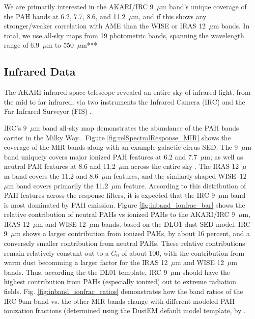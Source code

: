 \documentclass[preprint2,longabstract]{aastex}
\begin{document}
We are primarily interested in the AKARI/IRC 9~$\mu$m band's unique coverage of the PAH bands at 6.2, 7.7, 8.6, and 11.2~$\mu$m, and if this shows any stronger/weaker correlation with AME than the WISE or IRAS 12~$\mu$m bands. In total, we use all-sky maps from 19 photometric bands, spanning the wavelength range of 6.9~$\mu$m to 550~$\mu$m***

\subsection{Infrared Data}

     The AKARI infrared space telescope revealed an entire sky of infrared light, from the mid to far infrared, via two instruments \citep{akari07} the Infrared Camera (IRC)\citep{irc07} and the Far Infrared Surveyor (FIS) \citep{fis07}.

     IRC's 9~$\mu$m band all-sky map demonstrates the abundance of the PAH bands carrier in the Milky Way \citep{ishihara10}. Figure \ref{fig:relSpectralResponse_MIR} shows the coverage of the MIR bands along with an example galactic cirrus SED. The 9~$\mu$m band uniquely covers major ionized PAH features at 6.2 and 7.7~$\mu$m; as well as neutral PAH features at 8.6 and 11.2~$\mu$m across the entire sky \citep{irc07}. The IRAS 12~$\mu$m band covers the 11.2 and 8.6~$\mu$m features, and the similarly-shaped WISE~12~$\mu$m band covers primarily the 11.2~$\mu$m feature. According to this distribution of PAH features across the response filters, it is expected that the IRC 9~$\mu$m band is most dominated by PAH emission. Figure \ref{fig:inband_ionfrac_bar} shows the relative contribution of neutral PAHs vs ionized PAHs to the AKARI/IRC 9~$\mu$m, IRAS 12~$\mu$m and WISE 12~$\mu$m bands, based on the DLO1 dust SED model. IRC 9~$\mu$m shows a larger contribution from ionized PAHs, by about 16 percent, and a conversely smaller contribution from neutral PAHs. These relative contributions remain relatively constant out to a $G_{0}$ of about 100, with the contribution from warm dust becomming a larger factor for the IRAS 12~$\mu$m and WISE 12~$\mu$m bands. Thus, according the the DL01 template, IRC 9~$\mu$m should have the highest contribution from PAHs (especially ionized) out to extreme radiation fields. Fig. \ref{fig:inband_ionfrac_ratios} demonstrates how the band ratios of the IRC 9um band vs. the other MIR bands change with different modeled PAH ionization fractions (determined using the DustEM default model template, by \cite{compienge11}.
\end{document}
